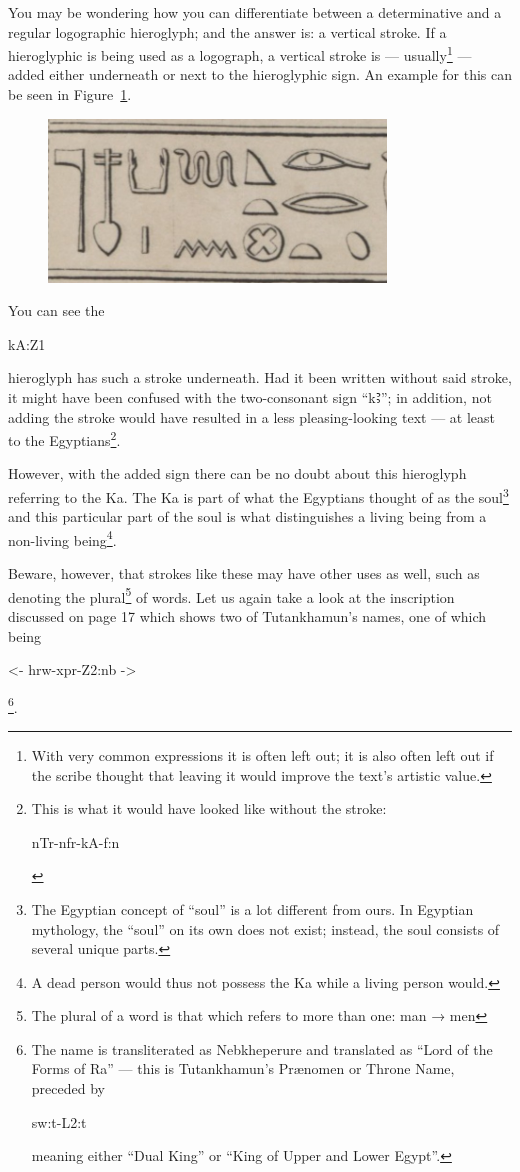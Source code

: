 \documentclass[a5paper,twoside,11pt]{report}
\newcommand{\AHiero}{{\fontspec{DejaVu Sans}Ꜣ}}
\begin{document}
		You may be wondering how you can differentiate between a determinative and a regular logographic hieroglyph; and the answer is: a vertical stroke. If a hieroglyphic is being used as a logograph, a vertical stroke is — usually\footnote{With very common expressions it is often left out; it is also often left out if the scribe thought that leaving it would improve the text’s artistic value.} — added either underneath or next to the hieroglyphic sign. An example for this can be seen in Figure~\ref{fig:3}.

		\begin{figure}
			\centering
			\includegraphics[width=0.8\textwidth]{images/img3.jpg}
			\caption{\cite{NYC:Ernst_Ptolost}}
			\label{fig:3}
		\end{figure}

		You can see the \begin{hieroglyph}kA:Z1\end{hieroglyph} hieroglyph has such a stroke underneath. Had it been written without said stroke, it might have been confused with the two-consonant sign “k\AHiero”; in addition, not adding the stroke would have resulted in a less pleasing-looking text — at least to the Egyptians\footnote{This is what it would have looked like without the stroke: \begin{hieroglyph}nTr-nfr-kA-f:n\end{hieroglyph}}.

		However, with the added sign there can be no doubt about this hieroglyph referring to the Ka. The Ka is part of what the Egyptians thought of as the soul\footnote{The Egyptian concept of “soul” is a lot different from ours. In Egyptian mythology, the “soul” on its own does not exist; instead, the soul consists of several unique parts.} and this particular part of the soul is what distinguishes a living being from a non-living being\footnote{A dead person would thus not possess the Ka while a living person would.}.

		Beware, however, that strokes like these may have other uses as well, such as denoting the plural\footnote{The plural of a word is that which refers to more than one: man → men} of words. Let us again take a look at the inscription discussed on page 17 which shows two of Tutankhamun’s names, one of which being \begin{hieroglyph}<- hrw-xpr-Z2:nb ->\end{hieroglyph}\footnote{The name is transliterated as Nebkheperure and translated as “Lord of the Forms of Ra” — this is Tutankhamun’s Prænomen or Throne Name, preceded by \begin{hieroglyph}sw:t-L2:t\end{hieroglyph} meaning either “Dual King” or “King of Upper and Lower Egypt”.}.
\end{document}
